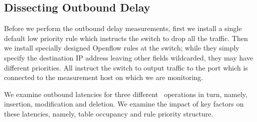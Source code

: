 \subsection{Dissecting Outbound Delay} 
\label{s:outbound_meas}


Before we perform the outbound delay measurements, first we install a single
default low priority rule which instructs the switch to drop all the traffic.
Then we install specially designed Openflow rules at the switch; while
they simply specify the destination IP address leaving other fields
wildcarded, they  may have different priorities. All 
instruct the switch to output traffic to the port which is connected  
to the measurement host on which we are monitoring.  


We examine outbound latencies for three different \flowmod\
operations in turn, namely, insertion, modification and deletion. We
examine the impact of key factors on these latencies, namely, table
occupancy and rule priority structure.



